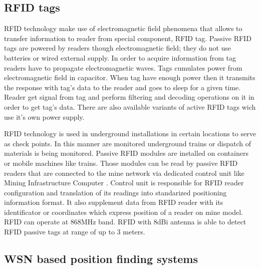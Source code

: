 \documentclass[../main.tex]{subfiles}
\begin{document}

\subsection{RFID tags} %
\label{sub:rfid_tags}

RFID technology make use of electromagnetic field phenomena that allows to transfer information to reader from special component, RFID tag. Passive RFID tags are powered by readers though electromagnetic field; they do not use batteries or wired external supply. In order to acquire information from tag readers have to propagate electromagnetic waves. Tags cumulates power from electromagnetic field in capacitor. When tag have enough power then it transmits the response with tag's data to the reader and goes to sleep for a given time. Reader get signal from tag and perform filtering and decoding operations on it in order to get tag's data. There are also available variants of active RFID tags wich use it's own power supply.

RFID technology is used in underground installations in certain locations to serve as check points. In this manner are monitored underground trains or dispatch of materials is being monitored. Passive RFID modules are installed on containers or mobile machines like trains. Those modules can be read by passive RFID readers that are connected to the mine network via dedicated control unit like Mining Infrastructure Computer \cite{Thesis_CM}. Control unit is responsible for RFID reader configuration and translation of its readings into standarized positioning information format. It also supplement data from RFID reader with its identificator or coordinates which express position of a reader on mine model. RFID can operate at 868MHz band. RFID with 8dBi antenna is able to detect RFID passive tags at range of up to 3 meters.



\subsection{WSN based position finding systems} %
\label{sub:wsn_based_position_finding_systems}
\end{document}
